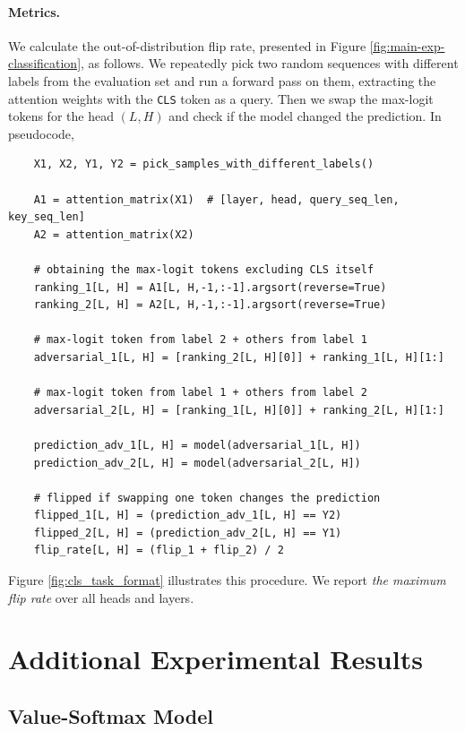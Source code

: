 \documentclass{article}
\theoremstyle{plain}
\theoremstyle{definition}
\theoremstyle{remark}
\begin{document}
\paragraph{Metrics.}

We calculate the out-of-distribution flip rate, presented in Figure \ref{fig:main-exp-classification}, as follows. We repeatedly pick two random sequences with different labels from the evaluation set and run a forward pass on them, extracting the attention weights with the \texttt{CLS} token as a query. Then we swap the max-logit tokens for the head $(L, H)$ and check if the model changed the prediction. In pseudocode,
{\small \begin{verbatim}
    X1, X2, Y1, Y2 = pick_samples_with_different_labels()
    
    A1 = attention_matrix(X1)  # [layer, head, query_seq_len, key_seq_len]
    A2 = attention_matrix(X2)

    # obtaining the max-logit tokens excluding CLS itself
    ranking_1[L, H] = A1[L, H,-1,:-1].argsort(reverse=True)
    ranking_2[L, H] = A2[L, H,-1,:-1].argsort(reverse=True)

    # max-logit token from label 2 + others from label 1
    adversarial_1[L, H] = [ranking_2[L, H][0]] + ranking_1[L, H][1:]

    # max-logit token from label 1 + others from label 2
    adversarial_2[L, H] = [ranking_1[L, H][0]] + ranking_2[L, H][1:]

    prediction_adv_1[L, H] = model(adversarial_1[L, H])
    prediction_adv_2[L, H] = model(adversarial_2[L, H])

    # flipped if swapping one token changes the prediction
    flipped_1[L, H] = (prediction_adv_1[L, H] == Y2)
    flipped_2[L, H] = (prediction_adv_2[L, H] == Y1)
    flip_rate[L, H] = (flip_1 + flip_2) / 2
\end{verbatim}}

Figure \ref{fig:cls_task_format} illustrates this procedure. We report \emph{the maximum flip rate} over all heads and layers.

\section{Additional Experimental Results}

\subsection{Value-Softmax Model}
\end{document}
